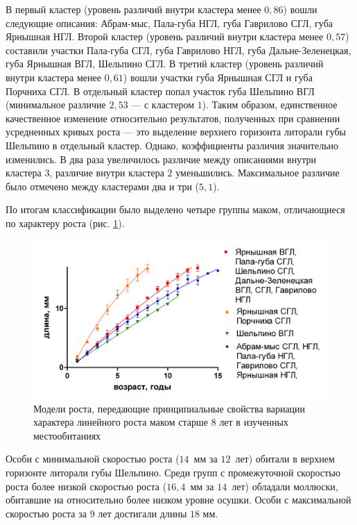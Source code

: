 В первый кластер (уровень различий внутри кластера менее $0,86$) вошли следующие описания:  Абрам-мыс, Пала-губа НГЛ, губа  Гаврилово  СГЛ, губа Ярнышная НГЛ. 
Второй кластер (уровень различий внутри кластера менее $0,57$) составили участки Пала-губа СГЛ, губа Гаврилово НГЛ, губа Дальне-Зеленецкая, губа Ярнышная ВГЛ, Шельпино СГЛ. 
В третий кластер (уровень различий внутри кластера менее $0,61$) вошли участки губа Ярнышная СГЛ и губа Порчниха СГЛ. 
В отдельный кластер попал участок губа Шельпино ВГЛ (минимальное различие $2,53$ --- с кластером $1$). 
Таким   образом,   единственное   качественное   изменение   относительно   результатов, полученных при сравнении усредненных кривых роста --- это выделение верхнего горизонта литорали губы Шельпино в отдельный кластер. 
Однако, коэффициенты различия значительно изменились. 
В два раза увеличилось различие между описаниями внутри кластера $3$, различие внутри кластера $2$ уменьшились. 
Максимальное различие было отмечено между кластерами два и три ($5,1$).

По итогам классификации было выделено четыре группы маком, отличающиеся по характеру роста (рис. \ref{ris:Barents_clusters_gorizonts_8year}). 
    \begin{figure}[p]
        \includegraphics[width=\textwidth]{../Barenc_Sea/growth_from_MSc/Rost_8+_clusters.jpg}
        \caption{Модели роста, передающие  принципиальные свойства вариации характера  линейного роста маком старше 8 лет в изученных местообитаниях}
    \label{ris:Barents_clusters_gorizonts_8year}
    \end{figure}
Особи с минимальной скоростью роста ($14$~мм за $12$~лет) обитали в верхнем горизонте литорали губы Шельпино.
Среди групп с промежуточной скоростью роста более   низкой   скоростью   роста   ($16,4$~мм   за   $14$~лет)   обладали   моллюски,   обитавшие   на относительно более низком уровне осушки. 
Особи с максимальной скоростью роста за $9$ лет достигали длины $18$ мм.

